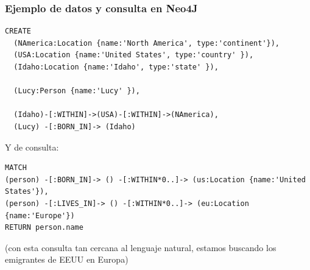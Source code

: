 \documentclass[14pt]{beamer}
\begin{document}
\begin{frame}
  \frametitle{Ejemplo de datos y consulta en Neo4J}
\begin{block}{}
\begin{lstlisting}
CREATE
  (NAmerica:Location {name:'North America', type:'continent'}),
  (USA:Location {name:'United States', type:'country' }),
  (Idaho:Location {name:'Idaho', type:'state' }),

  (Lucy:Person {name:'Lucy' }),

  (Idaho)-[:WITHIN]->(USA)-[:WITHIN]->(NAmerica),
  (Lucy) -[:BORN_IN]-> (Idaho)
\end{lstlisting}
\end{block}

\framebreak

Y de consulta:
\begin{block}{}
\begin{lstlisting}
MATCH
(person) -[:BORN_IN]-> () -[:WITHIN*0..]-> (us:Location {name:'United States'}),
(person) -[:LIVES_IN]-> () -[:WITHIN*0..]-> (eu:Location {name:'Europe'})
RETURN person.name
\end{lstlisting}
\end{block}

(con esta consulta tan cercana al lenguaje natural, estamos buscando los
emigrantes de EEUU en Europa)

\end{frame}
\end{document}
